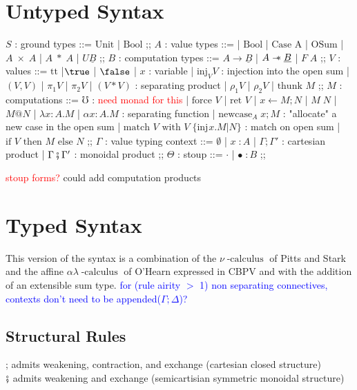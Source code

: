 \documentclass{article}
\makeatletter
\newcommand{\blue}[1]{\textcolor{blue}{#1}}
\newcommand{\red}[1]{\textcolor{red}{#1}}
\newcommand{\sep}{\mathrel{-\mkern-6mu*}}
\newcommand{\thunk}[1]{\textrm{thunk }#1}
\newcommand{\injj}[2]{\textrm{inj}_{#1}#2}
\newcommand{\err}{\mho}
\newcommand{\force}[1]{\textrm{force }#1}
\newcommand{\ret}[1]{\textrm{ret }#1}
\newcommand{\bind}[3]{#1 \leftarrow #2 ; #3}
\newcommand{\newcase}[3]{\textrm{newcase}_{#1} \; #2 ; #3}
\newcommand{\match}[5]{\textrm{match }#1 \textrm{ with }#2 \;\{#3 . #4 | #5\}}
\newcommand{\lett}[4]{\textrm{let }(#1,#2) = #3 ; #4}
\newcommand{\lets}[4]{\textrm{let }(#1*#2) = #3 ; #4}
\newcommand{\ite}[3]{\textrm{if }#1 \textrm{ then }#2 \textrm{ else }#3}
\newcommand{\at}{\textrm{@}}
\newcommand{\ttt}{\textrm{tt}}
\newcommand{\calculus}{\operatorname{-calculus}}
\makeatother
\begin{document}
\section{Untyped Syntax}
\begin{bnf}
$S$ : ground types ::= $\textrm{Unit}$
| $\textrm{Bool}$
;;
$A$ : value types ::= 
| $\textrm{Bool}$
| $\textrm{Case A}$ 
| $\textrm{OSum}$
| $A\; \times \; A$  
| $A\; * \; A$
| $U\underline{B}$
;;
$B$ : computation types ::= $A \rightarrow \underline{B}$ 
| $A \sep \underline{B}$
| $F\;A$
;;
$V$ : values ::= $\ttt$
|$\true$
| $\false$
| $x$ : variable
| $\injj{V}{V}$ : injection into the open sum
| $(V,V)$
| $\pi_1 V$
| $\pi_2 V$
| $(V*V)$ : separating product
| $\rho_1 V$
| $\rho_2 V$
| $\thunk{M}$
;;
$M$ : computations ::= $\err$ : \red{need monad for this}
| $\force{V}$
| $\ret{V}$
| $\bind{x}{M}{N}$
| $M \; N$
| $M \at N$
| $\lambda x \colon A . M$
| $\alpha x \colon A . M$ : separating function
| $\newcase{A}{x}{M}$ : "allocate" a new case in the open sum
| $\match{V}{V}{\injj{}{x}}{M}{N}$ : match on open sum
| $\ite{V}{M}{N}$
;;
$\Gamma$ : value typing context ::= $\emptyset$ 
| $ x \; \colon A$
| $\Gamma ; \Gamma'$ : cartesian product
| $\Gamma \fatsemi \Gamma'$ : monoidal product
;;
$\Theta$ : stoup ::= $\cdot$ 
| $\bullet \; \colon B$
;;
\end{bnf}
\red{stoup forms?} could add computation products
\begin{comment}
    | $\lett{x}{y}{V}{M}$
| $\lets{x}{y}{V}{M}$
\end{comment}

\newpage
\section{Typed Syntax}
This version of the syntax is a combination of the $\nu\calculus$\cite{stark:namerp-tlca}
\cite{starkCategoricalModelsLocal1996} of Pitts and Stark and the affine $\alpha\lambda\calculus$ of O'Hearn 
\cite{ohearnResourceInterpretationsBunched1999} expressed in CBPV and with the addition of an extensible sum type.
\blue{for (rule airity $>$ 1) non separating connectives, contexts don't need to be appended($\Gamma ; \Delta$)?}
\subsection{Structural Rules}
; admits weakening, contraction, and exchange (cartesian closed structure)\\
$\fatsemi$ admits weakening and exchange (semicartisian symmetric monoidal structure)
\end{document}
